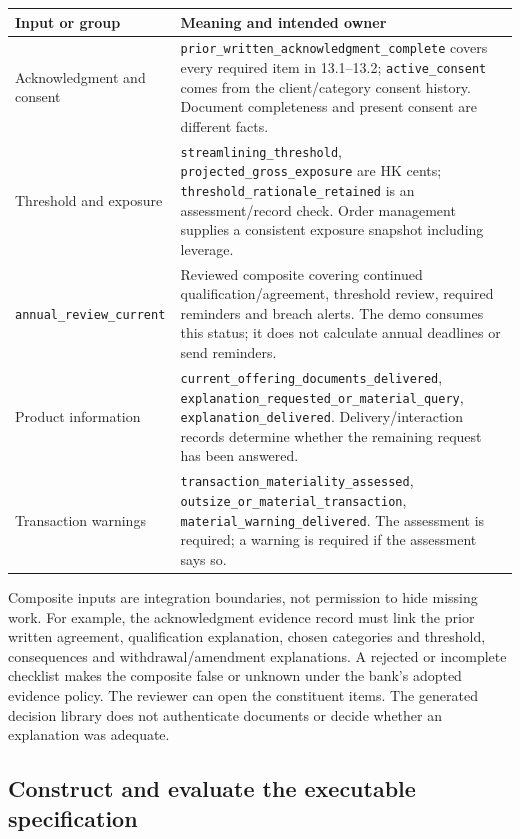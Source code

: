 \documentclass[12pt,a4paper,oneside,openany]{book}
\begin{document}
\endgroup
\begin{longtable}{P{0.30\textwidth}P{0.60\textwidth}}

\toprule Input or group & Meaning and intended owner \\\midrule
\endhead
Acknowledgment and consent & \texttt{prior\_written\_acknowledgment\_complete} covers every required item in 13.1--13.2; \texttt{active\_consent} comes from the client/category consent history. Document completeness and present consent are different facts.\\
Threshold and exposure & \texttt{streamlining\_threshold}, \texttt{projected\_gross\_exposure} are HK cents; \texttt{threshold\_rationale\_retained} is an assessment/record check. Order management supplies a consistent exposure snapshot including leverage.\\
\texttt{annual\_review\_current} & Reviewed composite covering continued qualification/agreement, threshold review, required reminders and breach alerts. The demo consumes this status; it does not calculate annual deadlines or send reminders.\\
Product information & \texttt{current\_offering\_documents\_delivered}, \texttt{explanation\_requested\_or\_material\_query}, \texttt{explanation\_delivered}. Delivery/interaction records determine whether the remaining request has been answered.\\
Transaction warnings & \texttt{transaction\_materiality\_assessed}, \texttt{outsize\_or\_material\_transaction}, \texttt{material\_warning\_delivered}. The assessment is required; a warning is required if the assessment says so.\\
\bottomrule
\end{longtable}
\endgroup

Composite inputs are integration boundaries, not permission to hide missing
work. For example, the acknowledgment evidence record must link the prior
written agreement, qualification explanation, chosen categories and threshold,
consequences and withdrawal/amendment explanations. A rejected or incomplete
checklist makes the composite false or unknown under the bank's adopted evidence
policy. The reviewer can open the constituent items. The generated decision
library does not authenticate documents or decide whether an explanation was
adequate.

\subsection{Construct and evaluate the executable specification}
\label{merge:P-01b-complete-dry-run:04}
\end{document}
